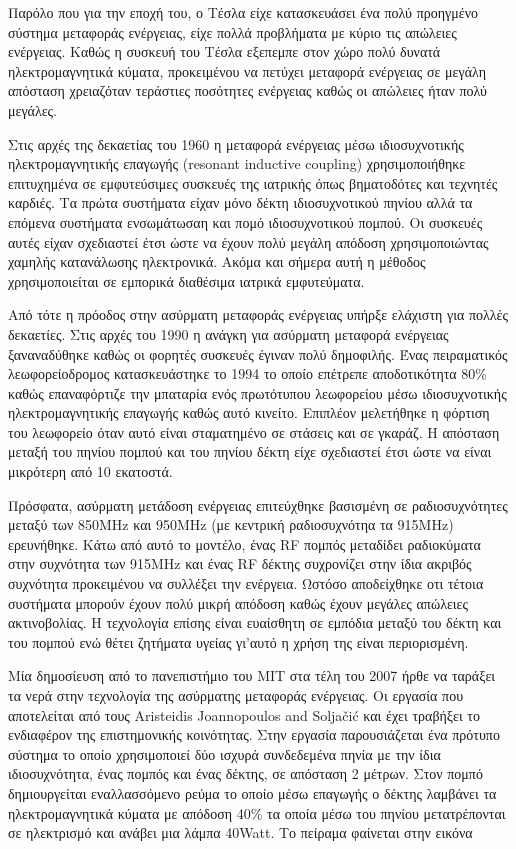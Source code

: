 Παρόλο που για την εποχή του, ο Τέσλα είχε κατασκευάσει ένα πολύ προηγμένο σύστημα μεταφοράς ενέργειας, είχε πολλά προβλήματα με κύριο τις απώλειες ενέργειας. Καθώς
η συσκευή του Τέσλα εξεπεμπε στον χώρο πολύ δυνατά ηλεκτρομαγνητικά κύματα, προκειμένου να πετύχει μεταφορά ενέργειας σε μεγάλη απόσταση χρειαζόταν τεράστιες
ποσότητες ενέργειας καθώς οι απώλειες ήταν πολύ μεγάλες.

Στις αρχές της δεκαετίας του 1960 η μεταφορά ενέργειας μέσω ιδιοσυχνοτικής ηλεκτρομαγνητικής επαγωγής (resonant inductive coupling) χρησιμοποιήθηκε επιτυχημένα σε
εμφυτεύσιμες συσκευές της ιατρικής όπως βηματοδότες και τεχνητές καρδιές. Τα πρώτα συστήματα είχαν μόνο δέκτη ιδιοσυχνοτικού πηνίου αλλά τα επόμενα συστήματα
ενσωμάτωσαη και πομό ιδιοσυχνοτικού πομπού. Οι συσκευές αυτές είχαν σχεδιαστεί έτσι ώστε να έχουν πολύ μεγάλη απόδοση χρησιμοποιώντας χαμηλής κατανάλωσης
ηλεκτρονικά. Ακόμα και σήμερα αυτή η μέθοδος χρησιμοποιείται σε εμπορικά διαθέσιμα ιατρικά εμφυτεύματα.

Από τότε η πρόοδος στην ασύρματη μεταφοράς ενέργειας υπήρξε ελάχιστη για πολλές δεκαετίες. Στις αρχές του 1990 η ανάγκη για ασύρματη μεταφορά ενέργειας
ξαναναδύθηκε καθώς οι φορητές συσκευές έγιναν πολύ δημοφιλής. Ένας πειραματικός λεωφορείοδρομος κατασκευάστηκε το 1994 \cite{bus_coil} το οποίο επέτρεπε
αποδοτικότητα 80\% καθώς επαναφόρτιζε την μπαταρία ενός πρωτότυπου λεωφορείου μέσω ιδιοσυχνοτικής ηλεκτρομαγνητικής επαγωγής καθώς αυτό κινείτο. Επιπλέον μελετήθηκε η
φόρτιση του λεωφορείο όταν αυτό είναι σταματημένο σε στάσεις και σε γκαράζ. Η απόσταση μεταξή του πηνίου πομπού και του πηνίου δέκτη είχε σχεδιαστεί έτσι ώστε να
είναι μικρότερη από 10 εκατοστά.

Πρόσφατα, ασύρματη μετάδοση ενέργειας επιτεύχθηκε βασισμένη σε ραδιοσυχνότητες μεταξύ των 850MHz και 950MHz (με κεντρική ραδιοσυχνότηα τα 915MHz) ερευνήθηκε. Κάτω
από αυτό το μοντέλο, ένας RF πομπός μεταδίδει ραδιοκύματα στην συχνότητα των 915MHz  και ένας RF δέκτης συχρονίζει στην ίδια ακριβός συχνότητα προκειμένου να
συλλέξει την ενέργεια. Ωστόσο αποδείχθηκε οτι τέτοια συστήματα μπορούν έχουν πολύ μικρή απόδοση καθώς έχουν μεγάλες απώλειες ακτινοβολίας. Η τεχνολογία επίσης είναι
ευαίσθητη σε εμπόδια μεταξύ του δέκτη και του πομπού ενώ θέτει ζητήματα υγείας γι'αυτό η χρήση της είναι περιορισμένη.

Μία δημοσίευση από το πανεπιστήμιο του MIT στα τέλη του 2007 ήρθε να ταράξει τα νερά στην τεχνολογία της ασύρματης μεταφοράς ενέργειας. Οι εργασία που αποτελείται
από τους Aristeidis Joannopoulos and Solja\v{c}i\'{c} και έχει τραβήξει το ενδιαφέρον της επιστημονικής κοινότητας. Στην εργασία παρουσιάζεται ένα πρότυπο σύστημα το
οποίο χρησιμοποιεί δύο ισχυρά συνδεδεμένα πηνία με την ίδια ιδιοσυχνότητα, ένας πομπός και ένας δέκτης, σε απόσταση 2 μέτρων. Στον πομπό δημιουργείται εναλλασσόμενο
ρεύμα το οποίο μέσω επαγωγής ο δέκτης λαμβάνει τα ηλεκτρομαγνητικά κύματα με απόδοση 40\% τα οποία μέσω του πηνίου μετατρέπονται σε ηλεκτρισμό και ανάβει μια λάμπα
40Watt. Το πείραμα φαίνεται στην εικόνα

